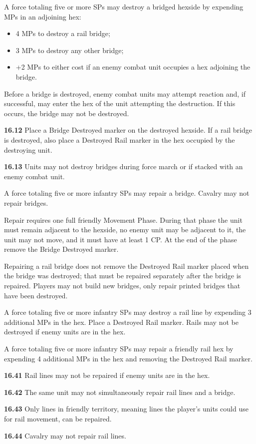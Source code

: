 

A force totaling five or more SPs may destroy a bridged hexside by expending MPs in an adjoining hex:
\begin{itemize}
\item 4 MPs to destroy a rail bridge;
\item 3 MPs to destroy any other bridge;
\item +2 MPs to either cost if an enemy combat unit occupies a hex adjoining the bridge.
\end{itemize}

Before a bridge is destroyed, enemy combat units may attempt reaction and, if successful, may enter the hex of the unit attempting the destruction. If this occurs, the bridge may not be destroyed.

\textbf{16.12} Place a Bridge Destroyed marker on the destroyed hexside. If a rail bridge is destroyed, also place a Destroyed Rail marker in the hex occupied by the destroying unit.

\textbf{16.13} Units may not destroy bridges during force march or if stacked with an enemy combat unit.


A force totaling five or more infantry SPs may repair a bridge. Cavalry may not repair bridges.

Repair requires one full friendly Movement Phase. During that phase the unit must remain adjacent to the hexside, no enemy unit may be adjacent to it, the unit may not move, and it must have at least 1 CP. At the end of the phase remove the Bridge Destroyed marker.

Repairing a rail bridge does not remove the Destroyed Rail marker placed when the bridge was destroyed; that must be repaired separately after the bridge is repaired. Players may not build new bridges, only repair printed bridges that have been destroyed.


A force totaling five or more infantry SPs may destroy a rail line by expending 3 additional MPs in the hex. Place a Destroyed Rail marker. Rails may not be destroyed if enemy units are in the hex.


A force totaling five or more infantry SPs may repair a friendly rail hex by expending 4 additional MPs in the hex and removing the Destroyed Rail marker.

\textbf{16.41} Rail lines may not be repaired if enemy units are in the hex.

\textbf{16.42} The same unit may not simultaneously repair rail lines and a bridge.

\textbf{16.43} Only lines in friendly territory, meaning lines the player's units could use for rail movement, can be repaired.

\textbf{16.44} Cavalry may not repair rail lines.
